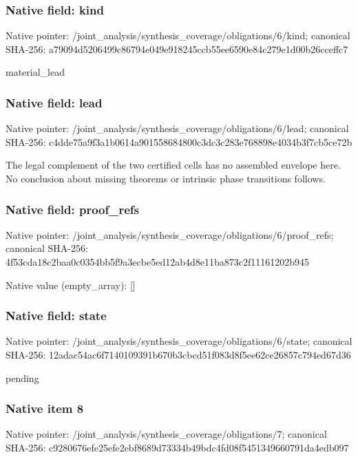 \documentclass[10pt,a4paper]{article}
\begin{document}
\subsubsection{Native field: kind}
Native pointer: /joint\_\allowbreak{}analysis/synthesis\_\allowbreak{}coverage/obligations/6/kind; canonical SHA-256: a79094d5206499c86794e049e918245ccb55ee6590e84c279e1d00b26cceffc7

\begingroup\raggedright\sloppy material\_\allowbreak{}lead\par\endgroup

\subsubsection{Native field: lead}
Native pointer: /joint\_\allowbreak{}analysis/synthesis\_\allowbreak{}coverage/obligations/6/lead; canonical SHA-256: c4dde75a9f3a1b0614a901558684800c3dc3c283e768898e4034b3f7cb5ce72b

\begingroup\raggedright\sloppy The legal complement of the two certified cells has no assembled envelope here. No conclusion about missing theorems or intrinsic phase transitions follows.\par\endgroup

\subsubsection{Native field: proof\_\allowbreak{}refs}
Native pointer: /joint\_\allowbreak{}analysis/synthesis\_\allowbreak{}coverage/obligations/6/proof\_\allowbreak{}refs; canonical SHA-256: 4f53cda18c2baa0c0354bb5f9a3ecbe5ed12ab4d8e11ba873c2f11161202b945

Native value (empty\_\allowbreak{}array): []

\subsubsection{Native field: state}
Native pointer: /joint\_\allowbreak{}analysis/synthesis\_\allowbreak{}coverage/obligations/6/state; canonical SHA-256: 12adac54ac6f7140109391b670b3cbcd51f083d8f5ee62ce26857c794ed67d36

\begingroup\raggedright\sloppy pending\par\endgroup

\subsubsection{Native item 8}
Native pointer: /joint\_\allowbreak{}analysis/synthesis\_\allowbreak{}coverage/obligations/7; canonical SHA-256: c9280676efe25efe2ebf8689d73334b49bdc4fd08f5451349660791da4edb097
\end{document}
